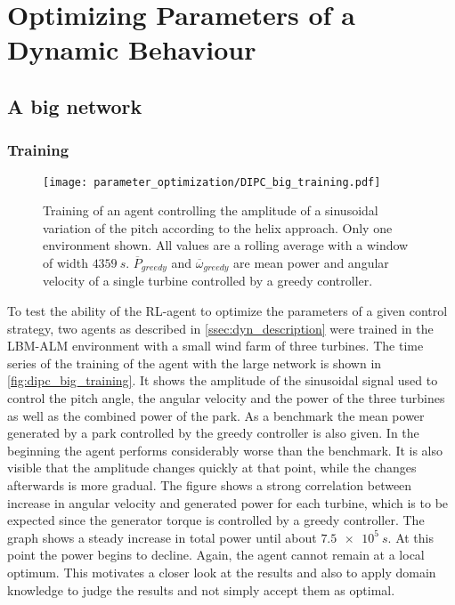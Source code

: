 \section{Optimizing Parameters of a Dynamic Behaviour}
\subsection{A big network}
\subsubsection{Training}
\begin{figure}[h]
	\centering
	\texttt{[image: parameter\_optimization/DIPC\_big\_training.pdf]}
	\caption{Training of an agent controlling the amplitude of a sinusoidal variation of the pitch according to the helix approach. Only one environment shown. All values are a rolling average with a window of width $\SI{4359}{s}$. $\overline{P}_{greedy}$ and $\overline{\omega}_{greedy}$ are mean power and angular velocity of a single turbine controlled by a greedy controller.}
	\label{fig:dipc_big_training}
\end{figure}
To test the ability of the RL-agent to optimize the parameters of a given control strategy, two agents as described in \autoref{ssec:dyn_description} were trained in the LBM-ALM environment with a small wind farm of three turbines. The time series of the training of the agent with the large network is shown in \autoref{fig:dipc_big_training}. It shows the amplitude of the sinusoidal signal used to control the pitch angle, the angular velocity and the power of the three turbines as well as the combined power of the park. As a benchmark the mean power generated by a park controlled by the greedy controller is also given. In the beginning the agent performs considerably worse than the benchmark. It is also visible that the amplitude changes quickly at that point, while the changes afterwards is more gradual. The figure shows a strong correlation between increase in angular velocity and generated power for each turbine, which is to be expected since the generator torque is controlled by a greedy controller. The graph shows a steady increase in total power until about $\SI{7.5e5}{s}$. At this point the power begins to decline. Again, the agent cannot remain at a local optimum. This motivates a closer look at the results and also to apply domain knowledge to judge the results and not simply accept them as optimal. \\
